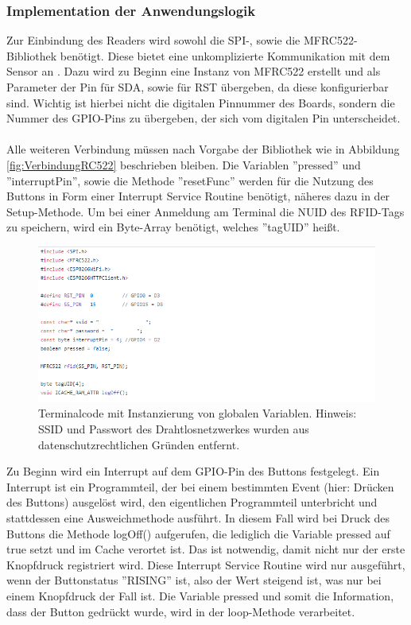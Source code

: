 \documentclass[12pt,titlepage]{scrartcl}
\begin{document}
			\subsubsection{Implementation der Anwendungslogik} \label{logicTerminal}
			Zur Einbindung des Readers wird sowohl die SPI-, sowie die MFRC522-Bibliothek benötigt. Diese bietet eine unkomplizierte Kommunikation mit dem Sensor an \cite{mfrc522git}. Dazu wird zu Beginn eine Instanz von MFRC522 erstellt und als Parameter der Pin für SDA, sowie für RST übergeben, da diese konfigurierbar sind. Wichtig ist hierbei nicht die digitalen Pinnummer des Boards, sondern die Nummer des GPIO-Pins zu übergeben, der sich vom digitalen Pin unterscheidet. \\ \\
			Alle weiteren Verbindung müssen nach Vorgabe der Bibliothek wie in Abbildung \ref{fig:VerbindungRC522} beschrieben bleiben. Die Variablen ''pressed'' und ''interruptPin'', sowie die Methode ''resetFunc'' werden für die Nutzung des Buttons in Form einer Interrupt Service Routine benötigt, näheres dazu in der Setup-Methode. Um bei einer Anmeldung am Terminal die NUID des RFID-Tags zu speichern, wird ein Byte-Array benötigt, welches ''tagUID'' heißt.\\
		\begin{figure}[H] 
  			\centering
    		\includegraphics[height=0.25\textheight]{terminalHead}
  			\caption{Terminalcode mit Instanzierung von globalen Variablen. Hinweis: SSID und Passwort des Drahtlosnetzwerkes wurden aus datenschutzrechtlichen Gründen entfernt.}
  			\label{fig:terminalHead}
		\end{figure}
		\noindent Zu Beginn wird ein Interrupt auf dem GPIO-Pin des Buttons festgelegt. Ein Interrupt ist ein Programmteil, der bei einem bestimmten Event (hier: Drücken des Buttons) ausgelöst wird, den eigentlichen Programmteil unterbricht und stattdessen eine Ausweichmethode ausführt. In diesem Fall wird bei Druck des Buttons die Methode logOff() aufgerufen, die lediglich die Variable pressed auf true setzt und im Cache verortet ist. Das ist notwendig, damit nicht nur der erste Knopfdruck registriert wird. Diese Interrupt Service Routine wird nur ausgeführt, wenn der Buttonstatus ''RISING'' ist, also der Wert steigend ist, was nur bei einem Knopfdruck der Fall ist. Die Variable pressed und somit die Information, dass der Button gedrückt wurde, wird in der loop-Methode verarbeitet. \\ \\
\end{document}
